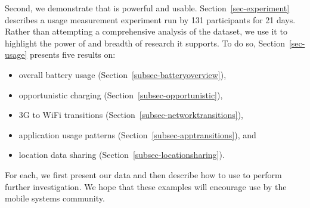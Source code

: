 Second, we demonstrate that \PhoneLab{} is powerful and usable.
Section~\ref{sec-experiment} describes a usage measurement experiment run by
131 \PhoneLab{} participants for 21 days. Rather than attempting a
comprehensive analysis of the dataset, we use it to highlight the power of
\PhoneLab{} and breadth of research it supports. To do so,
Section~\ref{sec-usage} presents five results on:

\begin{itemize}[nosep]
\vspace*{0.08in}
\item overall battery usage (Section~\ref{subsec-batteryoverview}),
\item opportunistic charging (Section~\ref{subsec-opportunistic}),
\item 3G to WiFi transitions (Section~\ref{subsec-networktransitions}),
\item application usage patterns (Section~\ref{subsec-apptransitions}), and
\item location data sharing (Section~\ref{subsec-locationsharing}).
\vspace*{0.08in}
\end{itemize}

For each, we first present our data and then describe how to use \PhoneLab{}
to perform further investigation. We hope that these examples will encourage
\PhoneLab{} use by the mobile systems community.
